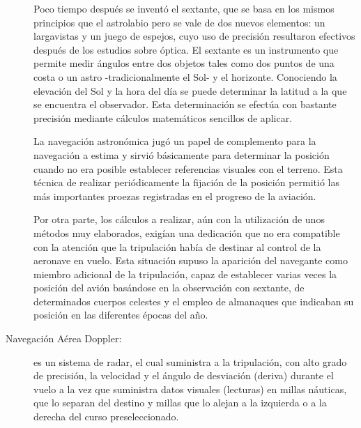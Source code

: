 \begin{description}

Poco tiempo despu\'es se invent\'o el sextante, que se basa en los mismos principios que el astrolabio pero se vale de dos nuevos elementos: un largavistas y un juego de espejos, cuyo uso de precisi\'on resultaron efectivos despu\'es de los estudios sobre \'optica. El sextante es un instrumento que permite medir \'angulos entre dos objetos tales como dos puntos de una costa o un astro -tradicionalmente el Sol- y el horizonte. Conociendo la elevaci\'on del Sol y la hora del d\'ia se puede determinar la latitud a la que se encuentra el observador. Esta determinaci\'on se efect\'ua con bastante precisi\'on mediante c\'alculos matem\'aticos sencillos de aplicar.

La navegaci\'on astron\'omica jug\'o un papel de complemento para la navegaci\'on a estima y sirvi\'o b\'asicamente para determinar la posici\'on cuando no era posible establecer referencias visuales con el terreno. Esta t\'ecnica de realizar peri\'odicamente la fijaci\'on de la posici\'on permiti\'o las m\'as importantes proezas registradas en el progreso de la aviaci\'on.

Por otra parte, los c\'alculos a realizar, a\'un con la utilizaci\'on de unos m\'etodos muy elaborados, exig\'ian una dedicaci\'on que no era compatible con la atenci\'on que la tripulaci\'on hab\'ia de destinar al control de la aeronave en vuelo. Esta situaci\'on supuso la aparici\'on del navegante como miembro adicional de la tripulaci\'on, capaz de establecer varias veces la posici\'on del avi\'on bas\'andose en la observaci\'on con sextante, de determinados cuerpos celestes y el empleo de almanaques que indicaban su posici\'on en las diferentes \'epocas del a\~no.




\item[Navegaci\'on A\'erea Doppler:] es un sistema de radar, el cual suministra a la tripulaci\'on, con alto grado de precisi\'on, la velocidad y el \'angulo de desviaci\'on (deriva) durante el vuelo a la vez que suministra datos visuales (lecturas) en millas n\'auticas, que lo separan del destino y millas que lo alejan a la izquierda o a la derecha del curso preseleccionado.


\end{description}
